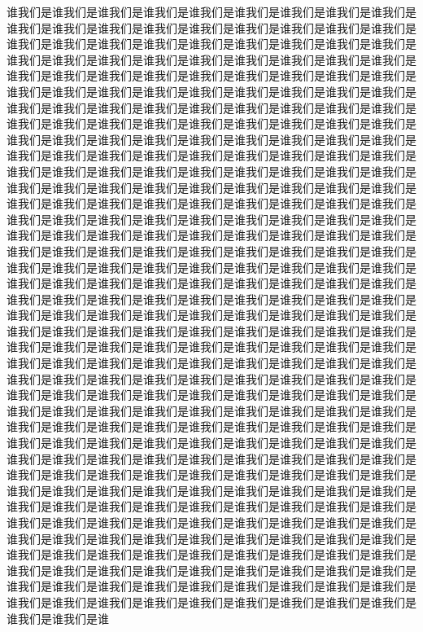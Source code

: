 \documentclass[twocolumn]{cvertbook}
\begin{document}
谁我们是谁我们是谁我们是谁我们是谁我们是谁我们是谁我们是谁我们是谁我们是谁我们是谁我们是谁我们是谁我们是谁我们是谁我们是谁我们是谁我们是谁我们是谁我们是谁我们是谁我们是谁我们是谁我们是谁我们是谁我们是谁我们是谁我们是谁我们是谁我们是谁我们是谁我们是谁我们是谁我们是谁我们是谁我们是谁我们是谁我们是谁我们是谁我们是谁我们是谁我们是谁我们是谁我们是谁我们是谁我们是谁我们是谁我们是谁我们是谁我们是谁我们是谁我们是谁我们是谁我们是谁我们是谁我们是谁我们是谁我们是谁我们是谁我们是谁我们是谁我们是谁我们是谁我们是谁我们是谁我们是谁我们是谁我们是谁我们是谁我们是谁我们是谁我们是谁我们是谁我们是谁我们是谁我们是谁我们是谁我们是谁我们是谁我们是谁我们是谁我们是谁我们是谁我们是谁我们是谁我们是谁我们是谁我们是谁我们是谁我们是谁我们是谁我们是谁我们是谁我们是谁我们是谁我们是谁我们是谁我们是谁我们是谁我们是谁我们是谁我们是谁我们是谁我们是谁我们是谁我们是谁我们是谁我们是谁我们是谁我们是谁我们是谁我们是谁我们是谁我们是谁我们是谁我们是谁我们是谁我们是谁我们是谁我们是谁我们是谁我们是谁我们是谁我们是谁我们是谁我们是谁我们是谁我们是谁我们是谁我们是谁我们是谁我们是谁我们是谁我们是谁我们是谁我们是谁我们是谁我们是谁我们是谁我们是谁我们是谁我们是谁我们是谁我们是谁我们是谁我们是谁我们是谁我们是谁我们是谁我们是谁我们是谁我们是谁我们是谁我们是谁我们是谁我们是谁我们是谁我们是谁我们是谁我们是谁我们是谁我们是谁我们是谁我们是谁我们是谁我们是谁我们是谁我们是谁我们是谁我们是谁我们是谁我们是谁我们是谁我们是谁我们是谁我们是谁我们是谁我们是谁我们是谁我们是谁我们是谁我们是谁我们是谁我们是谁我们是谁我们是谁我们是谁我们是谁我们是谁我们是谁我们是谁我们是谁我们是谁我们是谁我们是谁我们是谁我们是谁我们是谁我们是谁我们是谁我们是谁我们是谁我们是谁我们是谁我们是谁我们是谁我们是谁我们是谁我们是谁我们是谁我们是谁我们是谁我们是谁我们是谁我们是谁我们是谁我们是谁我们是谁我们是谁我们是谁我们是谁我们是谁我们是谁我们是谁我们是谁我们是谁我们是谁我们是谁我们是谁我们是谁我们是谁我们是谁我们是谁我们是谁我们是谁我们是谁我们是谁我们是谁我们是谁我们是谁我们是谁我们是谁我们是谁我们是谁我们是谁我们是谁我们是谁我们是谁我们是谁我们是谁我们是谁我们是谁我们是谁我们是谁我们是谁我们是谁我们是谁我们是谁我们是谁我们是谁我们是谁我们是谁我们是谁我们是谁我们是谁我们是谁我们是谁我们是谁我们是谁我们是谁我们是谁我们是谁我们是谁我们是谁我们是谁我们是谁我们是谁我们是谁我们是谁我们是谁我们是谁我们是谁我们是谁我们是谁我们是谁我们是谁我们是谁我们是谁我们是谁我们是谁我们是谁我们是谁我们是谁我们是谁我们是谁我们是谁我们是谁我们是谁我们是谁我们是谁我们是谁我们是谁我们是谁我们是谁我们是谁我们是谁我们是谁我们是谁我们是谁我们是谁我们是谁我们是谁我们是谁我们是谁我们是谁我们是谁我们是谁我们是谁我们是谁我们是谁我们是谁我们是谁我们是谁我们是谁我们是谁我们是谁我们是谁我们是谁我们是谁我们是谁我们是谁我们是谁我们是谁我们是谁我们是谁我们是谁我们是谁我们是谁我们是谁我们是谁我们是谁我们是谁我们是谁我们是谁我们是谁
\end{document}
